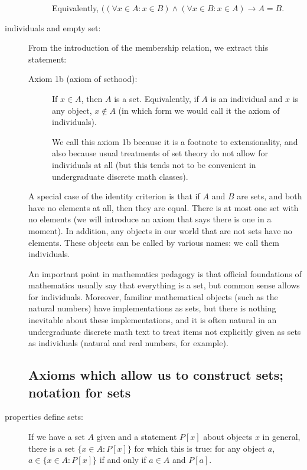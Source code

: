 \documentclass[12pt]{article}
\begin{document}
\begin{description}
\begin{description}
Equivalently, $((\forall x \in A: x\in B) \wedge (\forall x \in B:x \in A) \rightarrow A=B$.

\end{description}

\item[individuals and empty set:]   From the introduction of the membership relation, we extract this statement:  

\begin{description}
\item[Axiom 1b (axiom of sethood):]  If $x \in A$, then $A$ is a set.  Equivalently, if $A$ is an individual and $x$ is any object, $x \not\in A$ (in which form we would call it the axiom of individuals).

We call this axiom 1b because it is a footnote to extensionality, and also because usual treatments of set theory do not allow for individuals at all (but this tends not to be convenient in undergraduate discrete math classes).
\end{description}

A special case of the identity criterion is that if $A$ and $B$ are sets, and both have no elements at all, then they are equal.   There is at most one set with no elements (we will introduce an axiom that says there is one in a moment).  In addition, any objects in our world that are not sets have no elements.  These objects can be called by various names:  we call them individuals.

An important point in mathematics pedagogy is that official foundations of mathematics usually say that everything is a set,  but common sense allows for individuals.  Moreover, familiar mathematical objects (such as the natural numbers) have implementations as sets, but there is nothing inevitable about these implementations, and it is often natural in an undergraduate discrete math text to treat items not explicitly given as sets as individuals (natural and real numbers, for example).

\newpage

\subsection{Axioms which allow us to construct sets;  notation for sets}

\item[properties define sets:]  If we have a set $A$ given and a statement $P[x]$ about objects  $x$ in general, there is a set
$\{x \in A:P[x]\}$ for which this is true:  for any object $a$, $a \in \{x \in A:P[x]\}$ if and only if $a \in A$ and $P[a]$.


\end{description}
\end{document}
